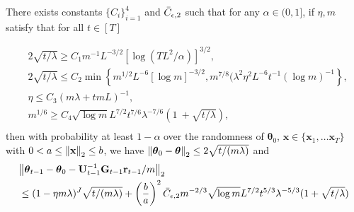 \begin{sublemma}
\label{lemma:lin_vs_regresion}
There exists constants $\{C_i\}^4_{i=1}$ and $\Bar{C}_{\epsilon,2}$ such that for
any $\alpha \in (0,1]$, if $\eta, m$ satisfy that for all $t \in [T]$ 

\begin{equation*}
\begin{split}
    & 2\sqrt{t/\lambda}\ge C_{1}m^{-1}L^{-3/2}\left[\log(T L^{2}/\alpha)\right]^{3/2}, \\
    & 2\sqrt{t/\lambda}\leq C_{2}\operatorname*{min}\left\{m^{1/2}L^{-6}[\log m]^{-3/2},m^{7/8}(\lambda^2 \eta^2L^{-6}t^{-1}(\log m)^{-1}\right\},\\
    & \eta\le C_{3}(m\lambda+t m L)^{-1}, \\
    & m^{1/6}\ge C_{4}\sqrt{\log m}L^{7/2}t^{7/6}\lambda^{-7/6}(1\ +\sqrt{t/\lambda}), \\
\end{split}
\end{equation*}
then with probability at least $1-\alpha$ over the randomness of $\boldsymbol{\theta}_0$, $\mathbf{x} \in \{\mathbf{x}_1, \dots \mathbf{x}_T\}$ with $0<  a \le \norm{\mathbf{x}}_2 \le b$, we have $\norm{\boldsymbol{\theta}_0 -  \boldsymbol{\theta}}_2 \le 2{\sqrt{t/(m\lambda)}}$ and
    \begin{equation*}
        \begin{split}
            &\norm{\boldsymbol{\theta}_{t-1} - \boldsymbol{\theta}_0 - \mathbf{U}^{-1}_{t-1}\mathbf{G}_{t-1} \mathbf{r}_{t-1}/m}_2\\
         & \leq(1-\eta m\lambda)^{J}\sqrt{t/(m\lambda)}+\left(\frac{b}{a}\right)^2 \Bar{C}_{\epsilon, 2}m^{-2/3}\sqrt{\log m}L^{7/2}t^{5/3}\lambda^{-5/3}(1+\sqrt{t/\lambda}) \\
        \end{split}
    \end{equation*}
\end{sublemma}

